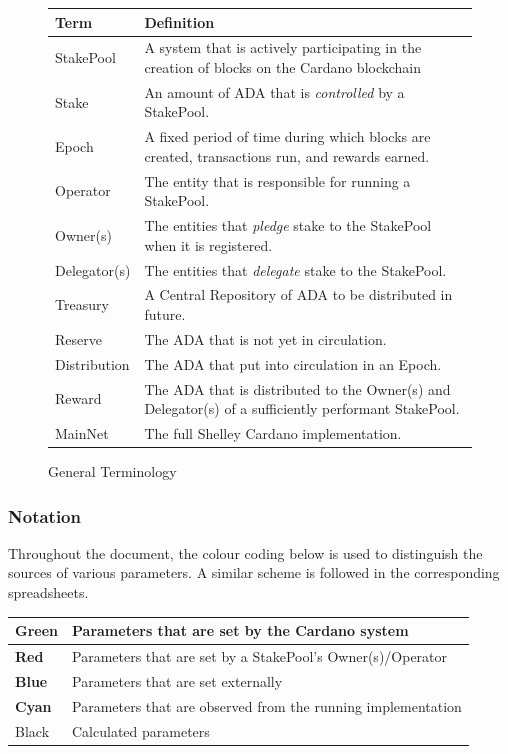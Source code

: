 \documentclass[11pt,a4paper,dvipsnames,twosided,final]{article}
\newcommand{\ada}{ADA{}}
\newcommand{\cardano}[1]{Cardano}
\begin{document}
\begin{figure}[t]
  \begin{center}
\begin{tabular}{||l|p{12cm}||}
  \hline \hline
\textbf{Term} & \textbf{Definition} \\\hline
  StakePool & A system that is actively participating in the creation of blocks on the \cardano{} blockchain  \\\hline
  Stake & An amount of \ada{} that is \emph{controlled} by a StakePool.\\\hline
  Epoch & A fixed period of time during which blocks are created, transactions run, and rewards earned.\\\hline
Operator & The entity that is responsible for running a StakePool. \\\hline
Owner(s) & The entities that \emph{pledge} stake to the StakePool when it is registered. \\\hline
  Delegator(s) & The entities that \emph{delegate} stake to the StakePool.\\\hline
  Treasury & A Central Repository of \ada{} to be distributed in future.\\\hline
  Reserve & The \ada{} that is not yet in circulation.\\\hline
  Distribution & The \ada{} that put into circulation in an Epoch.\\\hline
  Reward & The \ada{} that is distributed to the Owner(s) and Delegator(s) of a sufficiently performant StakePool.\\\hline
  MainNet & The full Shelley \cardano{} implementation.\\\hline
  \hline
\end{tabular}
\end{center}
\caption{General Terminology}
\label{fig:terminology}
\end{figure}

\newpage
\subsubsection*{Notation}

Throughout the document, the colour coding below is used to distinguish the sources of various parameters.
A similar scheme is followed in the corresponding spreadsheets.

\begin{tabular}{||l|l||}\hline\hline
  \textbf{\color{green} Green} & Parameters that are set by the \cardano{} system \\\hline
  \textbf{\color{red} Red} & Parameters that are set by a StakePool's Owner(s)/Operator \\\hline
  \textbf{\color{blue} Blue} & Parameters that are set externally \\\hline
  \textbf{\color{cyan} Cyan} & Parameters that are observed from the running implementation \\\hline
  Black & Calculated parameters \\\hline
\hline
\end{tabular}
\end{document}
